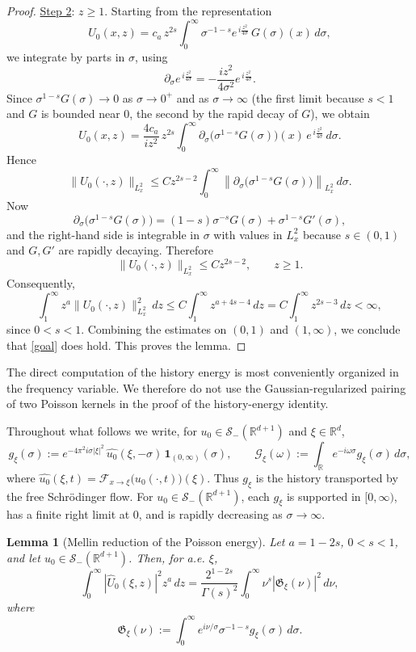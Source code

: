 \documentclass[11pt,letter]{amsart}
\def \RNu {\mathbb{R}^{d+1}}
\def \R {\mathbb{R}}
\def \G{\Gamma}
\newcommand{\Rd}{\mathbb R^d}
\numberwithin{equation}{section}
\newcommand{\Sm}{\mathscr S_-(\RNu)}
\newtheorem{lemma}[theorem]{Lemma}
\numberwithin{equation}{section}
\begin{document}
\begin{proof}
\medskip
\noindent \underline{Step 2}: $z\ge 1$.
Starting from the representation
\[
U_0(x,z)
=
c_a\,z^{2s}\int_0^\infty \sigma^{-1-s}
e^{\,i\frac{z^2}{4\sigma}}\,G(\sigma)(x)\,d\sigma,
\]
we integrate by parts in $\sigma$, using
\[
\partial_\sigma e^{\,i\frac{z^2}{4\sigma}}
=
-\frac{i z^2}{4\sigma^2}e^{\,i\frac{z^2}{4\sigma}}.
\]
Since $\sigma^{1-s}G(\sigma)\to 0$ as $\sigma\to 0^+$ and as $\sigma\to\infty$
(the first limit because $s<1$ and $G$ is bounded near $0$, the second by the
rapid decay of $G$), we obtain
\[
U_0(x,z)
=
\frac{4c_a}{iz^2}\,z^{2s}
\int_0^\infty
\partial_\sigma\!\bigl(\sigma^{1-s}G(\sigma)\bigr)(x)\,
e^{\,i\frac{z^2}{4\sigma}}\,d\sigma.
\]
Hence
\[
\|U_0(\cdot,z)\|_{L^2_x}
\le
C z^{2s-2}
\int_0^\infty
\left\|\partial_\sigma\!\bigl(\sigma^{1-s}G(\sigma)\bigr)\right\|_{L^2_x}\,d\sigma.
\]
Now
\[
\partial_\sigma\!\bigl(\sigma^{1-s}G(\sigma)\bigr)
=
(1-s)\sigma^{-s}G(\sigma)+\sigma^{1-s}G'(\sigma),
\]
and the right-hand side is integrable in $\sigma$ with values in $L^2_x$
because $s\in(0,1)$ and $G,G'$ are rapidly decaying. Therefore
\[
\|U_0(\cdot,z)\|_{L^2_x}\le C z^{2s-2},
\qquad z\ge 1.
\]
Consequently,
\[
\int_1^\infty z^a\|U_0(\cdot,z)\|_{L^2_x}^2\,dz
\le
C\int_1^\infty z^{a+4s-4}\,dz
=
C\int_1^\infty z^{2s-3}\,dz<\infty,
\]
since $0<s<1$.
Combining the estimates on $(0,1)$ and $(1,\infty)$, we conclude that \eqref{goal} does hold. This proves the lemma.

\end{proof}

The direct computation of the history energy is most conveniently organized
in the frequency variable. We therefore do not use the Gaussian-regularized
pairing of two Poisson kernels in the proof of the history-energy identity.

Throughout what follows we write, for $u_0\in\Sm$ and $\xi\in\Rd$,
\begin{equation}\label{E:Gxi}
g_\xi(\sigma):=e^{-4\pi^2i\sigma|\xi|^2}\,\widehat{u_0}(\xi,-\sigma)\,
\mathbf 1_{(0,\infty)}(\sigma),
\qquad
\mathscr G_\xi(\omega):=\int_{\R}e^{-i\omega\sigma}g_\xi(\sigma)\,d\sigma,
\end{equation}
where $\widehat{u_0}(\xi,t)=\mathscr F_{x\to\xi}\bigl(u_0(\cdot,t)\bigr)(\xi)$.
Thus $g_\xi$ is the history transported by the free Schr\"odinger flow. For
$u_0\in\Sm$, each $g_\xi$ is supported in $[0,\infty)$, has a finite right
limit at $0$, and is rapidly decreasing as $\sigma\to\infty$.

\begin{lemma}[Mellin reduction of the Poisson energy]\label{L:MellinReduction}
Let $a=1-2s$, $0<s<1$, and let $u_0\in\Sm$. Then, for a.e. $\xi$,
\begin{equation}\label{E:MellinReduction}
\int_0^\infty|\widehat U_0(\xi,z)|^2z^a\,dz
=
\frac{2^{1-2s}}{\G(s)^2}
\int_0^\infty \nu^s|\mathfrak G_\xi(\nu)|^2\,d\nu,
\end{equation}
where
\begin{equation}\label{E:mathfrakG}
\mathfrak G_\xi(\nu):=
\int_0^\infty e^{i\nu/\sigma}\sigma^{-1-s}g_\xi(\sigma)\,d\sigma.
\end{equation}
\end{lemma}
\end{document}
